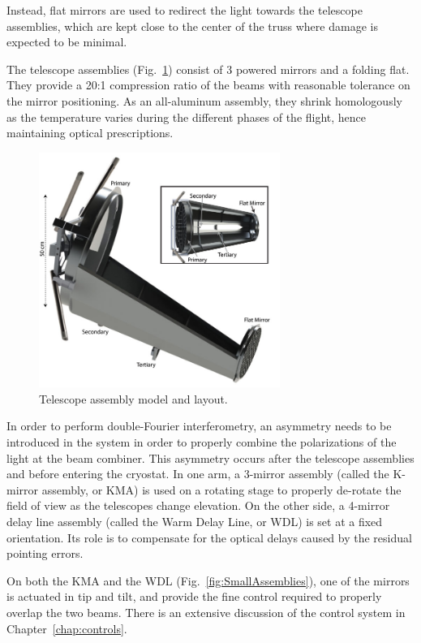 Instead, flat mirrors are used to redirect the light towards the telescope assemblies, which are kept close to the center of the truss where damage is expected to be minimal. 

The telescope assemblies (Fig.~\ref{fig:TelescopeAssemblyLayout}) consist of 3 powered mirrors and a folding flat. They provide a 20:1 compression ratio of the beams with reasonable tolerance on the mirror positioning. As an all-aluminum assembly, they shrink homologously as the temperature varies during the different phases of the flight, hence maintaining optical prescriptions. 

\begin{figure}[!h]
		\centering
		\includegraphics[width=0.7\textwidth]{Figures/TelescopeAssembly.jpg} 
		\caption[Telescope assembly layout]{Telescope assembly model and layout.}
		\label{fig:TelescopeAssemblyLayout}
\end{figure}


In order to perform double-Fourier interferometry, an asymmetry needs to be introduced in the system in order to properly combine the polarizations of the light at the beam combiner. This asymmetry occurs after the telescope assemblies and before entering the cryostat. In one arm, a 3-mirror assembly (called the K-mirror assembly, or KMA) is used on a rotating stage to properly de-rotate the field of view as the telescopes change elevation. On the other side, a 4-mirror delay line assembly (called the Warm Delay Line, or WDL) is set at a fixed orientation. Its role is to compensate for the optical delays caused by the residual pointing errors. 

On both the KMA and the WDL (Fig.~\ref{fig:SmallAssemblies}), one of the mirrors is actuated in tip and tilt, and provide the fine control required to properly overlap the two beams. There is an extensive discussion of the control system in Chapter~\ref{chap:controls}.

